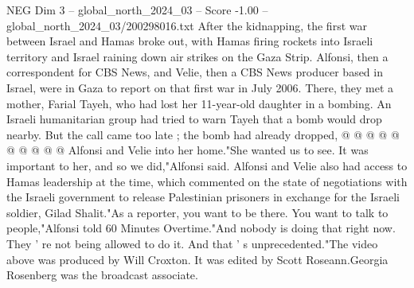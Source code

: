 \begin{textsample}{NEG Dim 3 – global\_north\_2024\_03 – Score -1.00 – global\_north\_2024\_03/200298016.txt}
After the kidnapping, the first war between Israel and Hamas broke out, with Hamas firing rockets into Israeli territory and Israel raining down air strikes on the Gaza Strip.
Alfonsi, then a correspondent for CBS News, and Velie, then a CBS News producer based in Israel, were in Gaza to report on that first war in July 2006.
There, they met a mother, Farial Tayeh, who had lost her 11-year-old daughter in a bombing.
An Israeli humanitarian group had tried to warn Tayeh that a bomb would drop nearby.
But the call came too late ; the bomb had already dropped, @ @ @ @ @ @ @ @ @ @ Alfonsi and Velie into her home."She wanted us to see.
It was important to her, and so we did,"Alfonsi said.
Alfonsi and Velie also had access to Hamas leadership at the time, which commented on the state of negotiations with the Israeli government to release Palestinian prisoners in exchange for the Israeli soldier, Gilad Shalit."As a reporter, you want to be there.
You want to talk to people,"Alfonsi told 60 Minutes Overtime."And nobody is doing that right now.
They ' re not being allowed to do it.
And that ' s unprecedented."The video above was produced by Will Croxton.
It was edited by Scott Roseann.Georgia Rosenberg was the broadcast associate.

\end{textsample}
